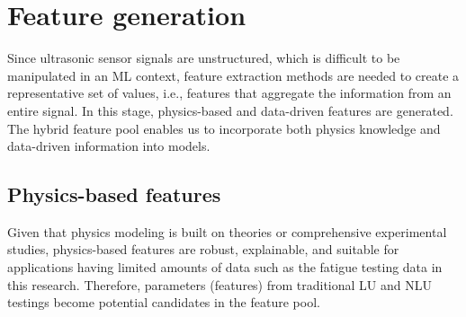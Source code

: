 \section{Feature generation}
Since ultrasonic sensor signals are unstructured, which is difficult to be manipulated in an ML context, feature extraction methods are needed to create a representative set of values, i.e., features that aggregate the information from an entire signal. In this stage, physics-based and data-driven features are generated. The hybrid feature pool enables us to incorporate both physics knowledge and data-driven information into models.

\subsection{Physics-based features}
Given that physics modeling is built on theories or comprehensive experimental studies, physics-based features are robust, explainable, and suitable for applications having limited amounts of data such as the fatigue testing data in this research. Therefore, parameters (features) from traditional LU and NLU testings become potential candidates in the feature pool.
